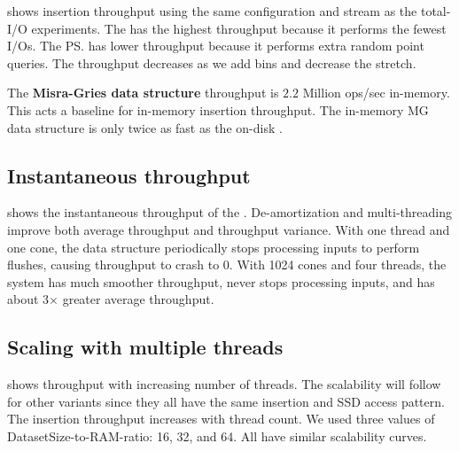  shows
insertion throughput using the same configuration and stream
as the total-I/O experiments.
%
The \cs has the highest throughput
because it performs the fewest I/Os. The \ps
has lower throughput because it performs extra random point queries. The \ts throughput decreases as we add bins and decrease
the stretch.

The {\bf Misra-Gries data structure}
throughput is $2.2$ Million ops/sec in-memory. This acts a baseline for
in-memory insertion throughput. The in-memory MG data structure is only twice as
fast as the on-disk \cs.

\subsection{Instantaneous throughput} 

 shows the instantaneous throughput of the
\cs. De-amortization and multi-threading improve both average throughput and
throughput variance.  With one thread and one cone, the data structure
periodically stops processing inputs to perform flushes, causing throughput to
crash to 0.  With 1024 cones and four threads, the system has much smoother
throughput, never stops processing inputs, and has about 3$\times$ greater
average throughput.


\subsection{Scaling with multiple threads}\label{scalability}

 shows \cs throughput with increasing
number of threads. 
The 
scalability will follow
for other variants 
since they all have the same insertion and SSD
access pattern.
%
The insertion throughput increases with thread count. 
We used three values of DatasetSize-to-RAM-ratio: 16, 32, and 64.
All have similar scalability curves.

